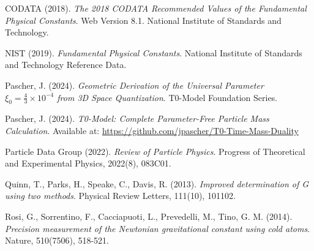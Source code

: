 \documentclass[12pt,a4paper]{article}
\theoremstyle{definition}
\begin{document}
	\newpage
	\begin{thebibliography}{99}
		
		CODATA (2018). \textit{The 2018 CODATA Recommended Values of the Fundamental Physical Constants}. 
		Web Version 8.1. National Institute of Standards and Technology.
		
		NIST (2019). \textit{Fundamental Physical Constants}. 
		National Institute of Standards and Technology Reference Data.
		
		Pascher, J. (2024). \textit{Geometric Derivation of the Universal Parameter $\xi_0 = \frac{4}{3} \times 10^{-4}$ from 3D Space Quantization}. 
		T0-Model Foundation Series.
		
		Pascher, J. (2024). \textit{T0-Model: Complete Parameter-Free Particle Mass Calculation}. 
		Available at: \url{https://github.com/jpascher/T0-Time-Mass-Duality}
		
		Particle Data Group (2022). \textit{Review of Particle Physics}. 
		Progress of Theoretical and Experimental Physics, 2022(8), 083C01.
		
		Quinn, T., Parks, H., Speake, C., Davis, R. (2013). \textit{Improved determination of G using two methods}. 
		Physical Review Letters, 111(10), 101102.
		
		Rosi, G., Sorrentino, F., Cacciapuoti, L., Prevedelli, M., Tino, G. M. (2014). \textit{Precision measurement of the Newtonian gravitational constant using cold atoms}. 
		Nature, 510(7506), 518-521.
		
	\end{thebibliography}
	
\end{document}
